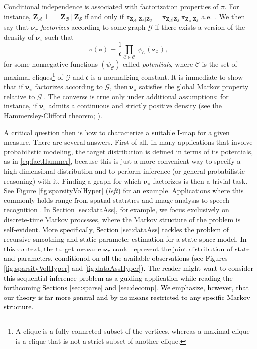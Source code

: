 \documentclass[twoside,11pt]{article}
\newcommand{\orth}{ \perp\!\!\!\perp }  %
\newcommand{\genm}{\boldsymbol{\nu} }   %
\newcommand{\Bc}{\mathcal{B}}
\newcommand{\Cc}{\mathcal{C}}
\newcommand{\Ac}{\mathcal{A}}
\newcommand{\Sc}{\mathcal{S}}
\newcommand{\Zb}{\boldsymbol{Z}}
\newcommand{\zb}{\boldsymbol{z}}
\newcommand{\Gcb}{\boldsymbol{\mathcal{G}}}
\newcommand{\Ccb}{\boldsymbol{\mathcal{C}}}
\newcommand{\cfrak}{\mathfrak{c}}
\newcommand{\Aset}{ \Ac }
\newcommand{\Bset}{ \Bc }
\newcommand{\Sset}{ \Sc }
\newcommand{\hrevone}{\textcolor{black} }
\begin{document}
%
Conditional independence is associated with factorization properties of 
$\pi$.
%
%
For instance,  $\Zb_{\Aset} \orth     \Zb_{\Bset} \, \vert \, \Zb_{\Sset}$ if and only if
$\pi_{\Zb_{\Aset} ,  \Zb_{\Bset} \vert \Zb_{\Sset}} = 
\pi_{\Zb_{\Aset}  \vert \Zb_{\Sset}} \, 
\pi_{\Zb_{\Bset}   \vert \Zb_{\Sset}} $ a.e.\ \citep{lauritzen1996graphical}.
%
We then say that $\genm_\pi$ {\it factorizes} according to some graph
%
%
%
%
%
%
%
%
$\Gcb$ if there exists a version of the density of $\genm_\pi$ such that
\begin{equation} \label{eq:factHammer}
     \pi(\zb) = \frac{1}{\cfrak} \prod_{\Cc \in\Ccb} \, \psi_{\Cc}(\zb_{\Cc}),
\end{equation}
for some nonnegative functions $(\psi_{\Cc})$ called \emph{potentials}, 
%
where
$\Ccb$ is the set of maximal cliques\footnote{ 
A clique is a fully connected subset of the vertices, 
whereas a maximal clique is a clique that is not a strict subset of another clique.
}
 of $\Gcb$ and $\cfrak$ is a 
 normalizing constant.
%
It is immediate to show that if $\genm_\pi$ factorizes according to $\Gcb$, then
$\genm_\pi$ satisfies the global Markov property relative to $\Gcb$
\citep[Prop.~3.8]{lauritzen1996graphical}.
%
%
%
%
%
%
%
%
%
%
%
%
%
%
The converse is true only under additional assumptions: 
for instance, if $\genm_\pi$ admits a  continuous and strictly positive density 
(see the Hammersley-Clifford theorem; \citealp{hammersley1971markov,lauritzen1996graphical}).
%
%
%

%
%
%
%
%
%
%
%
%
%
%
%
%
%
%
%
%
%
%
%
%
%
%
%
%
%
%
%
%
%
%
%
%
%
%
%
%
%
%
%

%
%

A critical question then is how to characterize a suitable I-map for a
given measure. There are several answers. 
%
First of all, in many applications that involve probabilistic modeling, 
the target distribution is defined 
%
in terms of %
its potentials, as in 
\eqref{eq:factHammer},
because this is just a more convenient
way to specify a high-dimensional
distribution and to perform inference (or general probabilistic reasoning)
with it. %
Finding a graph for which $\genm_\pi$ factorizes is then a trivial task.
%
%
%
%
%
%
See Figure \ref{fig:sparsityVolHyper} ({\it left}) for an example. 
Applications where this commonly holds range from spatial statistics and image analysis to speech recognition \citep{koller2009probabilistic,rue2005gaussian}. 
In Section \ref{sec:dataAss}, for example, we focus exclusively
on discrete-time Markov processes, where the
Markov structure of the problem is self-evident.
\hrevone{ 
More specifically, Section \ref{sec:dataAss} 
tackles the problem of recursive smoothing and
static parameter estimation for a state-space model.
In this context, the target measure $\genm_\pi$ could
represent the joint distribution of state and parameters, conditioned on
all the available observations (see   
Figures \ref{fig:sparsityVolHyper} and \ref{fig:dataAssHyper}).
%
The reader might want to consider this sequential inference problem
as a guiding application while reading the forthcoming Sections
\ref{sec:sparse} and \ref{sec:decomp}. We emphasize, however, that our
theory is far more general and by no means restricted to any specific Markov structure.
}
%
%
\end{document}
